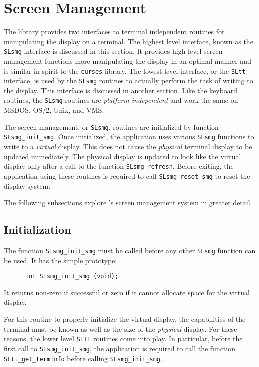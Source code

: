 \section{Screen Management} %

  The \slang{} library provides two interfaces to terminal independent
  routines for manipulating the display on a terminal.  The highest level
  interface, known as the \verb|SLsmg| interface is discussed in this
  section.  It provides high level screen management functions more
  manipulating the display in an optimal manner and is similar in spirit to
  the \verb|curses| library.  The lowest level interface, or the \verb|SLtt|
  interface, is used by the \verb|SLsmg| routines to actually perform the
  task of writing to the display.  This interface is discussed in another
  section.  Like the keyboard routines, the \verb|SLsmg| routines are {\em
  platform independent} and work the same on MSDOS, OS/2, Unix, and VMS.

  The screen management, or \verb|SLsmg|, routines are initialized by
  function \verb|SLsmg_init_smg|.  Once initialized, the application uses
  various \verb|SLsmg| functions to write to a {\em virtual} display.  This does
  not cause the {\em physical} terminal display to be updated immediately.  
  The physical display is updated to look like the virtual display only
  after a call to the function \verb|SLsmg_refresh|.  Before exiting, the
  application using these routines is required to call
  \verb|SLsmg_reset_smg| to reset the display system.
  
  The following subsections explore \slang's screen management system in
  greater detail.
  
\subsection{Initialization}

  The function \verb|SLsmg_init_smg| must be called before any other
  \verb|SLsmg| function can be used.  It has the simple prototype:
\begin{verbatim}
      int SLsmg_init_smg (void);
\end{verbatim} 
  It returns non-zero if successful or zero if it cannot allocate space for
  the virtual display.

  For this routine to properly initialize the virtual display, the
  capabilities of the terminal must be known as well as the size of the {\em
  physical} display.  For these reasons, the lower level \verb|SLtt| routines
  come into play.  In particular, before the first call to
  \verb|SLsmg_init_smg|, the application is required to call the function
  \verb|SLtt_get_terminfo| before calling \verb|SLsmg_init_smg|.

